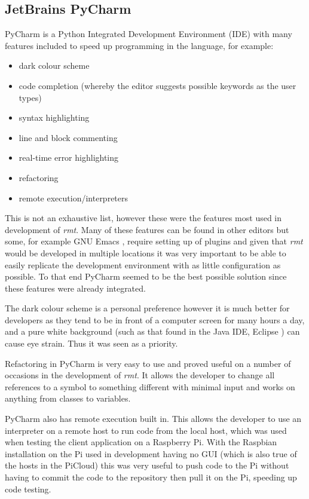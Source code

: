 \subsection{JetBrains PyCharm}
PyCharm \citep{pycharm} is a Python Integrated Development Environment (IDE) with many features included to speed up programming in the language, for example:
\begin{itemize}
	\item dark colour scheme
	\item code completion (whereby the editor suggests possible keywords as the user types)
	\item syntax highlighting
	\item line and block commenting
	\item real-time error highlighting
	\item refactoring
	\item remote execution/interpreters
\end{itemize}
This is not an exhaustive list, however these were the features most used in development of \emph{rmt}.
Many of these features can be found in other editors but some, for example GNU Emacs \citeyearpar{emacs}, require setting up of plugins and given that \emph{rmt} would be developed in multiple locations it was very important to be able to easily replicate the development environment with as little configuration as possible.
To that end PyCharm seemed to be the best possible solution since these features were already integrated.

The dark colour scheme is a personal preference however it is much better for developers as they tend to be in front of a computer screen for many hours a day, and a pure white background (such as that found in the Java IDE, Eclipse \citep{eclipse}) can cause eye strain.
Thus it was seen as a priority.

Refactoring in PyCharm is very easy to use and proved useful on a number of occasions in the development of \emph{rmt}.
It allows the developer to change all references to a symbol to something different with minimal input and works on anything from classes to variables.

PyCharm also has remote execution built in.
This allows the developer to use an interpreter on a remote host to run code from the local host, which was used when testing the client application on a Raspberry Pi.
With the Raspbian installation on the Pi used in development having no GUI (which is also true of the hosts in the PiCloud) this was very useful to push code to the Pi without having to commit the code to the repository then pull it on the Pi, speeding up code testing.
